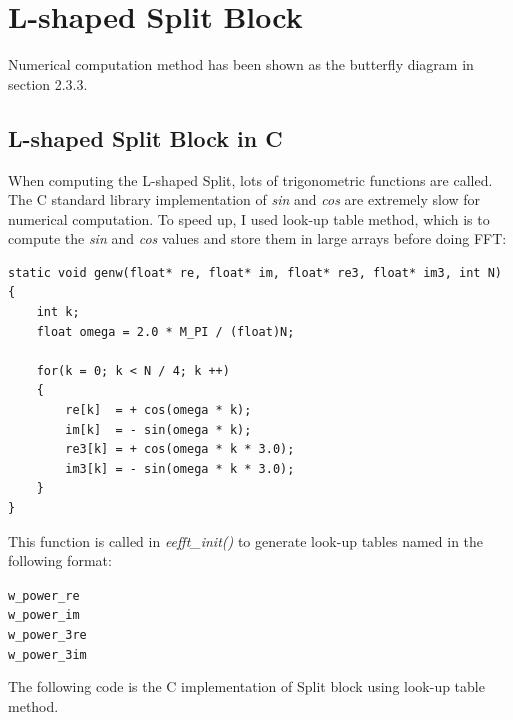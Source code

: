 \documentclass[a4paper]{report}
\begin{document}
\section{L-shaped Split Block} \indent


	Numerical computation method has been shown as the butterfly diagram in section 2.3.3.

\subsection{L-shaped Split Block in C} \indent

	When computing the L-shaped Split, lots of trigonometric functions are called. The C standard library implementation of \textit{sin} and \textit{cos} are extremely slow for numerical computation. To speed up, I used look-up table method, which is to compute the \textit{sin} and \textit{cos} values and store them in large arrays before doing FFT:
	
    \lstset{language = c, tabsize = 4}
    \begin{lstlisting}
static void genw(float* re, float* im, float* re3, float* im3, int N)
{
    int k;
    float omega = 2.0 * M_PI / (float)N;
    
    for(k = 0; k < N / 4; k ++)
    {
        re[k]  = + cos(omega * k);
        im[k]  = - sin(omega * k);
        re3[k] = + cos(omega * k * 3.0);
        im3[k] = - sin(omega * k * 3.0);
    }
}
    \end{lstlisting}
    
    This function is called in \textit{eefft\_init()} to generate look-up tables named in the following format:
    
\begin{alltt}
\centering
w_power_re
w_power_im
w_power_3re
w_power_3im
\end{alltt}
    
    The following code is the C implementation of Split block using look-up table method.
\end{document}
